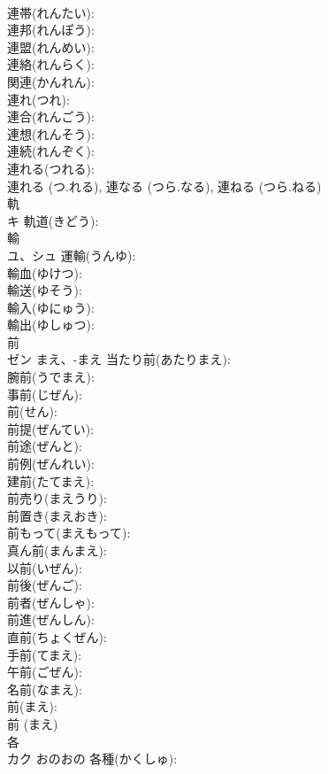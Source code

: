 \documentclass[8pt]{extreport}
\begin{document}
\begin{CJK}{UTF8}{min}
\\	連帯(れんたい): 
\\	連邦(れんぽう): 
\\	連盟(れんめい): 
\\	連絡(れんらく): 
\\	関連(かんれん): 
\\	連れ(つれ): 
\\	連合(れんごう): 
\\	連想(れんそう): 
\\	連続(れんぞく): 
\\	連れる(つれる): 
\\	連れる (つ.れる), 連なる (つら.なる), 連ねる (つら.ねる)
\\	軌			
\\	キ		軌道(きどう): 
\\	輸			
\\	ユ、シュ		運輸(うんゆ): 
\\	輸血(ゆけつ): 
\\	輸送(ゆそう): 
\\	輸入(ゆにゅう): 
\\	輸出(ゆしゅつ): 
\\	前			
\\	ゼン	まえ、-まえ	当たり前(あたりまえ): 
\\	腕前(うでまえ): 
\\	事前(じぜん): 
\\	前(せん): 
\\	前提(ぜんてい): 
\\	前途(ぜんと): 
\\	前例(ぜんれい): 
\\	建前(たてまえ): 
\\	前売り(まえうり): 
\\	前置き(まえおき): 
\\	前もって(まえもって): 
\\	真ん前(まんまえ): 
\\	以前(いぜん): 
\\	前後(ぜんご): 
\\	前者(ぜんしゃ): 
\\	前進(ぜんしん): 
\\	直前(ちょくぜん): 
\\	手前(てまえ): 
\\	午前(ごぜん): 
\\	名前(なまえ): 
\\	前(まえ): 
\\	前 (まえ)
\\	各			
\\	カク	おのおの	各種(かくしゅ): 

\end{CJK}
\end{document}
